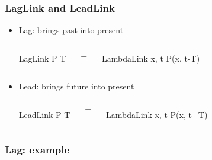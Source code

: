 \documentclass[aspectratio=169]{beamer}
\begin{document}
\begin{frame}[fragile]
  \frametitle{LagLink and LeadLink}

  \begin{itemize}
  \item
  \alert{Lag}: brings \alert{past} into present
  \begin{columns}
    \column{1in}

\begin{semiverbatim}
  LagLink
    P
    T


\end{semiverbatim}

    \column{0.5in}
    $$\equiv$$

    \column{1in}
\begin{semiverbatim}
LambdaLink
  x, t
  P(x, t-T)


\end{semiverbatim}

  \end{columns}

  \item
  \alert{Lead}: brings \alert{future} into present
  \begin{columns}
    \column{1in}

\begin{semiverbatim}
  LeadLink
    P
    T
\end{semiverbatim}

    \column{0.5in}
    $$\equiv$$

    \column{1in}
\begin{semiverbatim}
LambdaLink
  x, t
  P(x, t+T)
\end{semiverbatim}

  \end{columns}
  \end{itemize}

\end{frame}

\begin{frame}
  \frametitle{Lag: example}
\end{frame}
\end{document}
